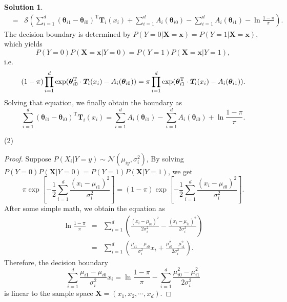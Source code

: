 \documentclass[a4paper,UTF8]{article}
\numberwithin{equation}{section}
\theoremstyle{definition}
\newtheorem*{solution}{Solution}
\begin{document}
\begin{solution}
\begin{eqnarray}
&=&\mathcal{S}(\sum_{i=1}^d(\bm\theta_{i1}-\bm\theta_{i0})^\mathrm{T}\bm{T}_i(x_i)+\sum_{i=1}^dA_i(\bm{\theta}_{i0})-\sum_{i=1}^dA_i(\bm{\theta}_{i1})-\ln\frac{1-\pi}{\pi}).
\end{eqnarray}
The decision boundary is determined by $P(Y=0|\bm{X}=\bm{x})=P(Y=1|\bm{X}=\bm{x})$, which yields
\begin{equation}
P(Y=0)P(\bm{X}=\bm{x}|Y=0)=P(Y=1)P(\bm{X}=\bm{x}|Y=1),
\end{equation}
i.e.
\begin{equation}
\centering
(1-\pi)\prod_{i=1}^d\exp(\bm\theta_{i0}^\mathrm{T}\cdot\bm{T}_i(x_i)-A_i(\bm{\theta}_{i0}))=\pi\prod_{i=1}^d\exp(\bm\theta_{i1}^\mathrm{T}\cdot\bm{T}_i(x_i)-A_i(\bm{\theta}_{i1})).
\end{equation}
Solving that equation, we finally obtain the boundary as
\begin{equation}
\sum_{i=1}^d(\bm\theta_{i1}-\bm\theta_{i0})^\mathrm{T}\bm{T}_i(x_i)=\sum_{i=1}^dA_i(\bm{\theta}_{i1})-\sum_{i=1}^dA_i(\bm{\theta}_{i0})+\ln\frac{1-\pi}{\pi}.
\end{equation}

\item[(2)] 
\begin{proof}
Suppose $P(X_i|Y=y)\sim \mathcal{N}(\mu_{iy}, \sigma_{i}^2)$, By solving $P(Y=0)P(\bm{X}|Y=0)=P(Y=1)P(\bm{X}|Y=1)$, we get
\begin{equation}
\pi\exp[-\frac{1}{2}\sum_{i=1}^d\frac{(x_i-\mu_{i1})^2}{\sigma_i^2}]=(1-\pi)\exp[-\frac{1}{2}\sum_{i=1}^d\frac{(x_i-\mu_{i0})^2}{\sigma_i^2}].
\end{equation}
After some simple math, we obtain the equation as
\begin{eqnarray}
\ln\frac{1-\pi}{\pi}&=&\sum_{i=1}^d\left(\frac{(x_i-\mu_{i0})^2}{2\sigma_i^2}-\frac{(x_i-\mu_{i1})^2}{2\sigma_i^2}\right)\nonumber\\
&=&\sum_{i=1}^d\left(\frac{\mu_{i1}-\mu_{i0}}{\sigma_i^2}x_i+\frac{\mu_{i0}^2-\mu_{i1}^2}{2\sigma_i^2}\right).
\end{eqnarray}
Therefore, the decision boundary
\begin{equation}
\sum_{i=1}^d\frac{\mu_{i1}-\mu_{i0}}{\sigma_i^2}x_i=\ln\frac{1-\pi}{\pi}-\sum_{i=1}^d\frac{\mu_{i0}^2-\mu_{i1}^2}{2\sigma_i^2}
\end{equation}
is linear to the sample space $\bm{X}=(x_1,x_2,\cdots,x_d)$.
\end{proof}
~\\
\end{solution}
\end{document}
